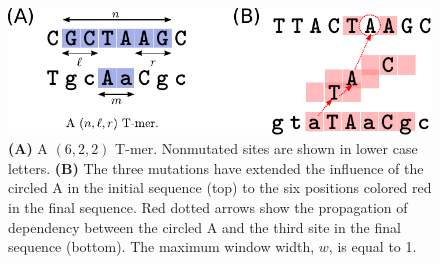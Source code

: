 \documentclass{article}
\newcommand{\nA}{\mbox{A}}  %
\theoremstyle{plain}
\theoremstyle{definition}
\begin{document}
\begin{figure}
    \begin{center}
        \includegraphics{Tmer-dependency}
    \end{center}
    \caption{
        \textbf{(A)} A $(6,2,2)$ T-mer.
        Nonmutated sites are shown in lower case letters.
        \textbf{(B)}
        The three mutations have extended the influence of the circled \nA{}
        in the initial sequence (top)
        to the six positions colored red in the final sequence.
        Red dotted arrows show the propagation of dependency
        between the circled \nA{}
        and the third site in the final sequence (bottom).
        The maximum window width, $w$, is equal to 1.
        \label{fig:Tmers}
    }
\end{figure}
\end{document}
